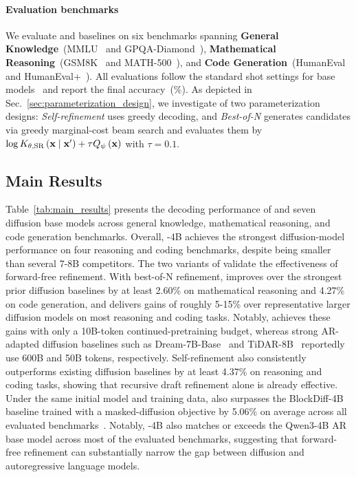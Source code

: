 \paragraph{Evaluation benchmarks}
We evaluate \method and baselines on six benchmarks spanning \textbf{General Knowledge}~(MMLU~\citep{mmlu} and GPQA-Diamond~\citep{gpqa}), \textbf{Mathematical Reasoning}~(GSM8K~\citep{gsm8k} and MATH-500~\citep{math500}), and \textbf{Code Generation}~(HumanEval~\citep{humaneval} and HumanEval+~\citep{humaneval_plus}). 
All evaluations follow the standard shot settings for base models~\cite{qwen3} and report the final accuracy~(\%). 
As depicted in Sec.~\ref{sec:parameterization_design}, we investigate \method of two parameterization designs: \emph{Self-refinement} uses greedy decoding, and \emph{Best-of-N} generates candidates via greedy marginal-cost beam search and evaluates them by $\log K_{\theta,\mathrm{SR}}\left(\mathbf{x}\mid\mathbf{x}'\right)+\tau Q_\psi\left(\mathbf{x}\right)$ with $\tau=0.1$.

\subsection{Main Results}

Table~\ref{tab:main_results} presents the decoding performance of \method and seven diffusion base models across general knowledge, mathematical reasoning, and code generation benchmarks. 
Overall, \method-4B achieves the strongest diffusion-model performance on four reasoning and coding benchmarks, despite being smaller than several 7-8B competitors. 
The two variants of \method validate the effectiveness of forward-free refinement. 
With best-of-N refinement, \method improves over the strongest prior diffusion baselines by at least 2.60\% on mathematical reasoning and 4.27\% on code generation, and delivers gains of roughly 5-15\% over representative larger diffusion models on most reasoning and coding tasks. 
Notably, \method achieves these gains with only a 10B-token continued-pretraining budget, whereas strong AR-adapted diffusion baselines such as Dream-7B-Base~\citep{dream7b} and TiDAR-8B~\citep{tidar} reportedly use 600B and 50B tokens, respectively.
Self-refinement also consistently outperforms existing diffusion baselines by at least 4.37\% on reasoning and coding tasks, showing that recursive draft refinement alone is already effective. 
Under the same initial model and training data, \method also surpasses the BlockDiff-4B baseline trained with a masked-diffusion objective by 5.06\% on average across all evaluated benchmarks~\citep{block_diffusion}. 
Notably, \method-4B also matches or exceeds the Qwen3-4B AR base model across most of the evaluated benchmarks, suggesting that forward-free refinement can substantially narrow the gap between diffusion and autoregressive language models. 




